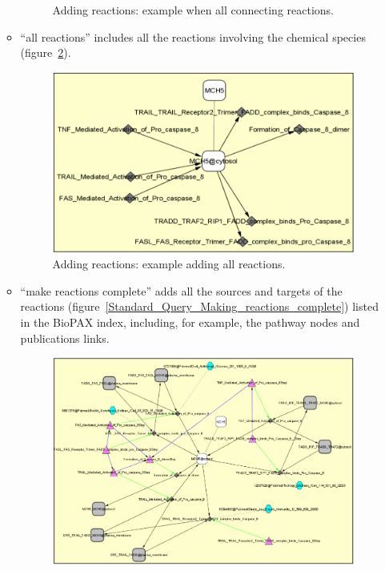 \begin{itemize}
\begin{itemize}
\begin{figure}[h]
\caption{Adding reactions: example when all connecting reactions.}
\label{Standard_Query_All_connecting_reactions}
\end{figure}
\item “all reactions” includes all the reactions involving the chemical species (figure~\ref{Standard_Query_Adding_all_reactions}).
\begin{figure}[h]
\centering
\includegraphics[width=18 cm]{graphics/Standard_Query_Adding_all_reactions}
\caption{Adding reactions: example adding all reactions.}
\label{Standard_Query_Adding_all_reactions}
\end{figure}
\item “make reactions complete” adds all the sources and targets of the reactions (figure~\ref{Standard_Query_Making_reactions_complete}) listed in the BioPAX index, including, for example, the pathway nodes and publications links.
\begin{figure}[h]
\centering
\includegraphics[width=18 cm]{graphics/Standard_Query_Making_reactions_complete}

\end{figure}
\end{itemize}
\end{itemize}
